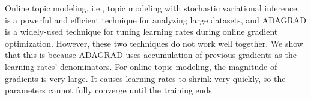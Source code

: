 Online topic modeling, i.e., topic modeling with stochastic variational inference, is a powerful and efficient technique for analyzing large datasets, and ADAGRAD is a widely-used technique for tuning learning rates during online gradient optimization. However, these two techniques do not work well together. We show that this is because ADAGRAD uses accumulation of previous gradients as the learning rates' denominators. For online topic modeling, the magnitude of gradients is very large. It causes learning rates to shrink very quickly, so the parameters cannot fully converge until the training ends
